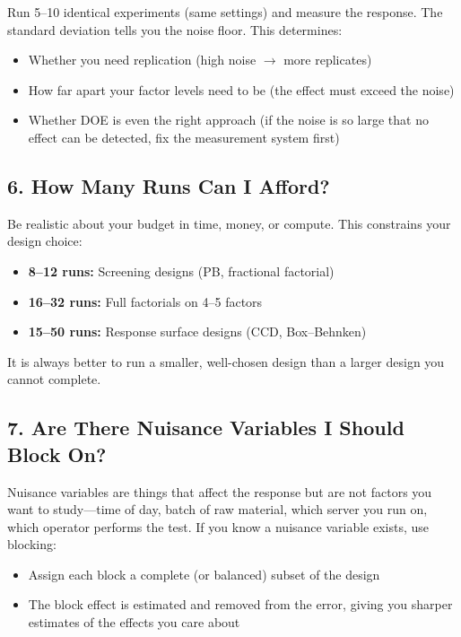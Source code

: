 \documentclass[11pt]{book}
\begin{document}
Run 5--10 identical experiments (same settings) and measure the response. The
standard deviation tells you the noise floor. This determines:
\begin{itemize}[nosep]
\item Whether you need replication (high noise $\to$ more replicates)
\item How far apart your factor levels need to be (the effect must exceed the
      noise)
\item Whether DOE is even the right approach (if the noise is so large that no
      effect can be detected, fix the measurement system first)
\end{itemize}

\subsection{6. How Many Runs Can I Afford?}

Be realistic about your budget in time, money, or compute. This constrains your
design choice:
\begin{itemize}[nosep]
\item \textbf{8--12 runs:} Screening designs (PB, fractional factorial)
\item \textbf{16--32 runs:} Full factorials on 4--5 factors
\item \textbf{15--50 runs:} Response surface designs (CCD, Box--Behnken)
\end{itemize}

It is always better to run a smaller, well-chosen design than a larger design
you cannot complete.

\subsection{7. Are There Nuisance Variables I Should Block On?}

Nuisance variables are things that affect the response but are not factors you
want to study---time of day, batch of raw material, which server you run on,
which operator performs the test. If you know a nuisance variable exists, use
blocking:
\begin{itemize}[nosep]
\item Assign each block a complete (or balanced) subset of the design
\item The block effect is estimated and removed from the error, giving you
      sharper estimates of the effects you care about
\end{itemize}
\end{document}
